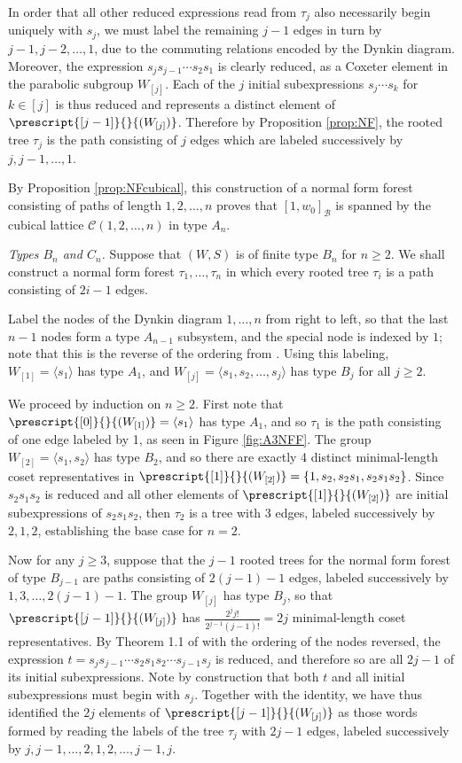 \documentclass[11pt]{amsart}
\theoremstyle{plain}
\theoremstyle{definition}
\newcommand{\cC}{\mathcal{C}}
\newcommand{\cB}{\mathcal B}
\numberwithin{equation}{subsection}
\begin{document}
In order that all other reduced expressions read from $\tau_j$ also necessarily begin uniquely with $s_j$, we must label the remaining $j-1$ edges in turn by $j-1, j-2, \dots, 1$, due to the commuting relations encoded by the Dynkin diagram. Moreover, the expression $s_js_{j-1} \cdots s_2s_1$ is clearly reduced, as a Coxeter element in the parabolic subgroup $W_{[j]}$. Each of the $j$ initial subexpressions $s_j \cdots s_k$ for $k \in [j]$ is thus reduced and represents a distinct element of $\prescript{[j-1]}{}{(W_{[j]})}$. Therefore by Proposition \ref{prop:NF}, the rooted tree $\tau_j$ is the path consisting of $j$ edges which are labeled successively by $j, j-1, \dots, 1$.  


By Proposition \ref{prop:NFcubical}, this construction of a normal form forest consisting of paths of length $1, 2, \dots, n$ proves that  $[1,w_0]_\cB$ is spanned by the cubical lattice $\cC(1, 2, \dots, n)$ in type $A_n$.


\emph{Types $B_n$ and $C_n$.} Suppose that $(W,S)$ is of finite type $B_n$ for $n \geq 2$. We shall construct a normal form forest $\tau_1, \dots, \tau_n$ in which every rooted tree $\tau_i$ is a path consisting of $2i-1$ edges.


Label the nodes of the Dynkin diagram $1, \dots, n$ from right to left, so that the last $n-1$ nodes form a type $A_{n-1}$ subsystem, and the special node is indexed by $1$; note that this is the reverse of the ordering from \cite{Bourbaki4-6}. Using this labeling, $W_{[1]} = \langle s_1 \rangle$ has type $A_1$, and $W_{[j]} = \langle s_1, s_2, \dots, s_j \rangle$ has type $B_j$ for all $j \geq 2$.  

We proceed by induction on $n \geq 2$.  First note that $\prescript{[0]}{}{(W_{[1]})} = \langle s_1\rangle$ has type $A_1$, and so $\tau_1$ is the path consisting of one edge labeled by 1, as seen in Figure \ref{fig:A3NFF}.  The group $W_{[2]} = \langle s_1, s_2 \rangle$ has type $B_2$, and so there are exactly 4 distinct minimal-length coset representatives in $\prescript{[1]}{}{(W_{[2]})} = \{ 1, s_2, s_2s_1, s_2s_1s_2\}$.  Since $s_2s_1s_2$ is reduced and all other elements of $\prescript{[1]}{}{(W_{[2]})}$ are initial subexpressions of $s_2s_1s_2$, then $\tau_2$ is a tree with 3 edges, labeled successively by $2, 1, 2$, establishing the base case for $n=2$.

Now for any $j \geq 3$, suppose that the $j-1$ rooted trees for the normal form forest of type $B_{j-1}$ are paths consisting of $2(j-1)-1$ edges, labeled successively by $1, 3, \dots, 2(j-1)-1$.  The group $W_{[j]}$ has type $B_j$, so that $\prescript{[j-1]}{}{(W_{[j]})}$ has $\frac{2^j j ! }{ 2^{j-1} (j-1)!} = 2j$ minimal-length coset representatives. By Theorem 1.1 of \cite{MilRWs} with the ordering of the nodes reversed, the expression $t = s_js_{j-1} \cdots s_2s_1s_2 \cdots s_{j-1}s_j$ is reduced, and therefore so are all $2j-1$ of its initial subexpressions.  Note by construction that both $t$ and all initial subexpressions must begin with $s_j$.  Together with the identity, we have thus identified the $2j$ elements of $\prescript{[j-1]}{}{(W_{[j]})}$ as those words formed by reading the labels of the tree $\tau_j$ with $2j-1$ edges, labeled successively by $j, j-1, \dots, 2,1,2, \dots, j-1, j$.
\end{document}
